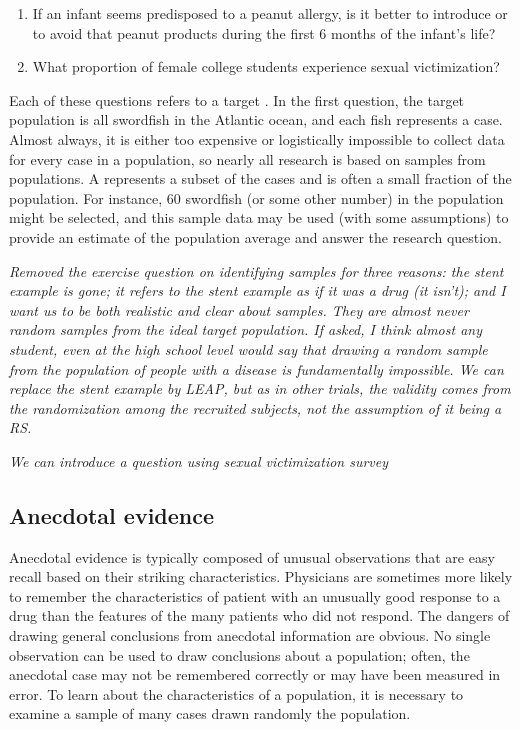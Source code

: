 \begin{doublespace}
\begin{enumerate}
\item If an infant seems predisposed to a peanut allergy, is it better to introduce or to avoid that peanut products during the first 6 months of the infant's life?

\item What proportion of female college students experience sexual victimization?

\end{enumerate}

Each of these questions refers to a target . In the first question, the target population is all swordfish in the Atlantic ocean, and each fish represents a case. Almost always, it is either too expensive or logistically impossible to collect data for every case in a population, so nearly all research is based on samples from populations. A  represents a subset of the cases and is often a small fraction of the population. For instance, 60 swordfish (or some other number) in the population might be selected, and this sample data may be used (with some assumptions) to provide an estimate of the population average and answer the research question.

\textit{Removed the exercise question on identifying samples for three reasons: the stent example is gone; it refers to the stent example as if it was a drug (it isn't); and I want us to be both realistic and clear about samples.  They are almost never random samples from the ideal target population. If asked, I think almost any student, even at the high school level would say that drawing a random sample from the population of people with a disease is fundamentally impossible.  We can replace the stent example by LEAP, but as in other trials, the validity comes from the randomization among the recruited subjects, not the assumption of it being a RS.}

\textit{We can introduce a question using sexual victimization survey}


\subsection{Anecdotal evidence}
\label{anecdotalEvidenceSubsection}

Anecdotal evidence is typically composed of unusual observations that are easy recall based on their striking characteristics. Physicians are sometimes more likely to remember the characteristics of patient with an unusually good response to a drug than the features of the many patients who did not respond.  The dangers of drawing general conclusions from anecdotal information are obvious. No single observation can be used to draw conclusions about a population; often, the anecdotal case may not be remembered correctly or may have been measured in error.  To learn about the characteristics of a population, it is necessary to examine a sample of many cases drawn randomly the population.


\end{doublespace}
